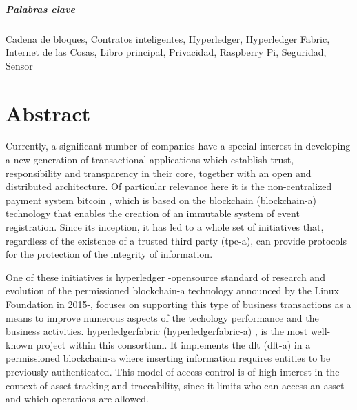 \documentclass[12pt,a4paper, twoside]{report}
\newcommand\modified[1]{\textcolor{dgreen}{#1}} %
\begin{document}
	\paragraph{Palabras clave \\}
	\thispagestyle{empty}

	Cadena de bloques, Contratos inteligentes, Hyperledger,
        Hyperledger Fabric, Internet de las Cosas, Libro principal,
        Privacidad, Raspberry Pi, Seguridad, Sensor
	
	\chapter*{Abstract}
	\thispagestyle{empty}
		
	\vspace{-0.3cm}

	Currently, a significant number of companies have a special
        interest in developing a new generation of transactional
        applications which establish trust, responsibility and
        transparency in their core, together with an open and
        distributed architecture. Of particular relevance here it is
        the non-centralized payment system \gls{bitcoin}
        \cite{bitcoin}, which is based on the \Gls{blockchain}
        (\gls{blockchain-a}) \cite{iansiti:2017:ttab} technology that
        enables the creation of an immutable system of event
        registration. Since its inception, it has led to a whole set
        of initiatives that, regardless of the existence of a trusted
        third party (\gls{tpc-a}), can provide protocols for the
        protection of the integrity of information.
		
	One of these initiatives is \gls{hyperledger}
        \cite{hyperledger:url} -\gls{opensource} standard of research
        and evolution of the permissioned \gls{blockchain-a}
        technology announced by the Linux Foundation in 2015-, focuses
        on supporting this type of business \glspl{transaction} as a
        means to improve numerous \modified{aspects of the techology
          performance and the business
          activities}. \gls{hyperledgerfabric}
        (\gls{hyperledgerfabric-a}) \cite{hyperledgerfabric:url}, is
        the most well-known project within this consortium. It
        implements the \gls{dlt} (\gls{dlt-a}) \cite{wattenhofer:DLT}
        in a permissioned \gls{blockchain-a} where inserting
        information requires entities to be previously
        authenticated. This model of access control is of high
        interest in the context \modified{of asset tracking and
          traceability}, since it limits \modified{who can access an
          asset and which operations are allowed}.
	
\end{document}
